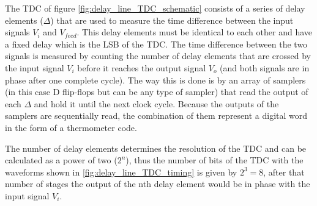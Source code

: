 The TDC of figure \ref{fig:delay_line_TDC_schematic} consists of a series of delay elements ($\Delta$) that are used to measure the time difference between the input signals $V_i$ 
and $V_{feed}$. This delay elements must be identical to each other and have a fixed delay which is the LSB of the TDC. The time difference between the two signals is measured by counting
the number of delay elements that are crossed by the input signal $V_i$ before it reaches the output signal $V_o$ (and both signals are in phase after one complete cycle). The way this is done is by an array of samplers (in this case D flip-flops
but can be any type of sampler) that read the output of each $\Delta$ and hold it until the next clock cycle. Because the outputs of the samplers are sequentially read, the combination
of them represent a digital word in the form of a thermometer code.

The number of delay elements determines the resolution of the TDC and can be calculated as a power of two ($2^n$), thus the number of bits of the TDC with the
waveforms shown in \ref{fig:delay_line_TDC_timing} is given by $2^3 = 8$, after that number of stages the output of the nth delay element would be in phase with the input signal $V_i$.

\begin{center}
    \label{fig:delay_line_TDC_timing}
\end{center}

